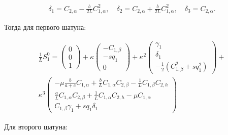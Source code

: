 \begin{equation}
\begin{aligned}
	\delta_1 = C_{2,\alpha} - \frac{b}{2L}C^2_{1,\alpha},\quad \delta_2 = C_{2,\alpha} + \frac{b}{2L}C^2_{1,\alpha},\quad \delta_3 = C_{2,\alpha}.
\end{aligned}
\end{equation}

Тогда для первого шатуна:

\begin{equation}
\begin{aligned}
	\frac{1}{L}S_1^0 = \begin{pmatrix} 0 \\ 0 \\ 1\end{pmatrix} + \kappa\begin{pmatrix}-C_{1,\beta} \\ -sq_1 \\ 0 \end{pmatrix} + \kappa^2\begin{pmatrix}\gamma_1 \\ \delta_1 \\ -\frac{1}{2}\left(C^2_{1,\beta} + sq^2_1\right)\end{pmatrix} + \\ \kappa^3\begin{pmatrix}
	-\mu \frac{b}{a+c}C_{1,\alpha} + \frac{b}{L}C_{1,\alpha}C_{2,\beta} - \frac{1}{L}C_{1,\beta}C_{2,h}\\
	\frac{a}{L}C_{1,\alpha}C_{2,\beta} + \frac{1}{L}C_{1,\alpha}C_{2,h} - \mu C_{1,\alpha} \\
	C_{1,\beta}\gamma_1 + sq_1\delta_1
	\end{pmatrix}
\end{aligned}
\end{equation}

Для второго шатуна:

